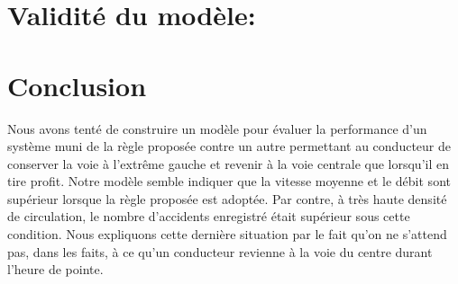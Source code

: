 \documentclass[12pt,letterpaper]{article}
\begin{document}
\section*{Validité du modèle:}




\section{Conclusion}

Nous avons tenté de construire un modèle pour évaluer la performance d'un système muni de la règle
proposée contre un autre permettant au conducteur de conserver la voie à l'extrême gauche et revenir
à la voie centrale que lorsqu'il en tire profit. Notre modèle semble indiquer que la vitesse moyenne
et le débit sont supérieur lorsque la règle proposée est adoptée. Par contre, à très haute densité
de circulation, le nombre d'accidents enregistré était supérieur sous cette condition. Nous
expliquons cette dernière situation par le fait qu'on ne s'attend pas, dans les faits, à ce qu'un
conducteur revienne à la voie du centre durant l'heure de pointe.
\end{document}
